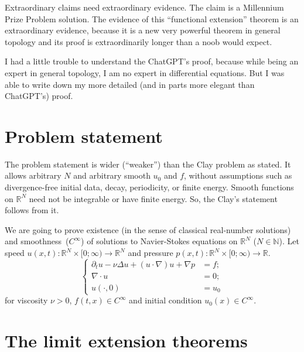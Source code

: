 \documentclass{amsart}
\begin{document}
Extraordinary claims need extraordinary evidence. The claim is a Millennium Prize Problem solution. The evidence of this ``functional extension'' theorem is an extraordinary evidence, because it is a new very powerful theorem in general topology and its proof is extraordinarily longer than a noob would expect.

I had a little trouble to understand the ChatGPT's proof, because while being an expert in general topology, I am no expert in differential equations. But I was able to write down my more detailed (and in parts more elegant than ChatGPT's) proof.

\section{Problem statement}

The problem statement is wider (``weaker'') than the Clay problem as stated.  It allows arbitrary
$N$ and arbitrary smooth $u_0$ and $f$, without assumptions such as
divergence-free initial data, decay, periodicity, or finite energy.  Smooth
functions on $\mathbb{R}^N$ need not be integrable or have finite energy. So, the Clay's statement follows from it.

We are going to prove existence (in the sense of classical real-number solutions) and smoothness~($C^\infty$) of solutions to Na\-vi\-er-Sto\-kes equations on $\mathbb{R}^N$ ($N\in\mathbb{N}$).
Let speed $u(x,t):\mathbb{R}^N\times[0;\infty)\to\mathbb{R}^N$ and pressure $p(x,t):\mathbb{R}^N\times[0;\infty)\to\mathbb{R}$.
\[
\left\{
\begin{aligned}
\partial_t u - \nu\Delta u + (u \cdot \nabla) u + \nabla p &= f ;\\
\nabla \cdot u &= 0;\\
u({\cdot},0) &= u_0
\end{aligned}
\right.
\]
for viscosity $\nu>0$, $f(t,x)\in C^\infty$ and initial condition $u_0(x)\in C^\infty$.

\section{The limit extension theorems}
\end{document}
